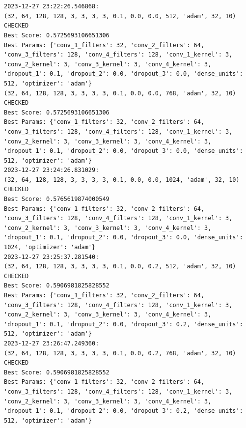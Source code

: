
\section{}
\label{app:appendix-a}


\newpage
\section{}
\label{app:appendix-b}

\begin{verbatim}
2023-12-27 23:22:26.546868:
(32, 64, 128, 128, 3, 3, 3, 3, 0.1, 0.0, 0.0, 512, 'adam', 32, 10) CHECKED
Best Score: 0.5725693106651306
Best Params: {'conv_1_filters': 32, 'conv_2_filters': 64, 'conv_3_filters': 128, 'conv_4_filters': 128, 'conv_1_kernel': 3, 'conv_2_kernel': 3, 'conv_3_kernel': 3, 'conv_4_kernel': 3, 'dropout_1': 0.1, 'dropout_2': 0.0, 'dropout_3': 0.0, 'dense_units': 512, 'optimizer': 'adam'}
(32, 64, 128, 128, 3, 3, 3, 3, 0.1, 0.0, 0.0, 768, 'adam', 32, 10) CHECKED
Best Score: 0.5725693106651306
Best Params: {'conv_1_filters': 32, 'conv_2_filters': 64, 'conv_3_filters': 128, 'conv_4_filters': 128, 'conv_1_kernel': 3, 'conv_2_kernel': 3, 'conv_3_kernel': 3, 'conv_4_kernel': 3, 'dropout_1': 0.1, 'dropout_2': 0.0, 'dropout_3': 0.0, 'dense_units': 512, 'optimizer': 'adam'}
2023-12-27 23:24:26.831029:
(32, 64, 128, 128, 3, 3, 3, 3, 0.1, 0.0, 0.0, 1024, 'adam', 32, 10) CHECKED
Best Score: 0.5765619874000549
Best Params: {'conv_1_filters': 32, 'conv_2_filters': 64, 'conv_3_filters': 128, 'conv_4_filters': 128, 'conv_1_kernel': 3, 'conv_2_kernel': 3, 'conv_3_kernel': 3, 'conv_4_kernel': 3, 'dropout_1': 0.1, 'dropout_2': 0.0, 'dropout_3': 0.0, 'dense_units': 1024, 'optimizer': 'adam'}
2023-12-27 23:25:37.281540:
(32, 64, 128, 128, 3, 3, 3, 3, 0.1, 0.0, 0.2, 512, 'adam', 32, 10) CHECKED
Best Score: 0.5906981825828552
Best Params: {'conv_1_filters': 32, 'conv_2_filters': 64, 'conv_3_filters': 128, 'conv_4_filters': 128, 'conv_1_kernel': 3, 'conv_2_kernel': 3, 'conv_3_kernel': 3, 'conv_4_kernel': 3, 'dropout_1': 0.1, 'dropout_2': 0.0, 'dropout_3': 0.2, 'dense_units': 512, 'optimizer': 'adam'}
2023-12-27 23:26:47.249360: 
(32, 64, 128, 128, 3, 3, 3, 3, 0.1, 0.0, 0.2, 768, 'adam', 32, 10) CHECKED
Best Score: 0.5906981825828552
Best Params: {'conv_1_filters': 32, 'conv_2_filters': 64, 'conv_3_filters': 128, 'conv_4_filters': 128, 'conv_1_kernel': 3, 'conv_2_kernel': 3, 'conv_3_kernel': 3, 'conv_4_kernel': 3, 'dropout_1': 0.1, 'dropout_2': 0.0, 'dropout_3': 0.2, 'dense_units': 512, 'optimizer': 'adam'}

\end{verbatim}
